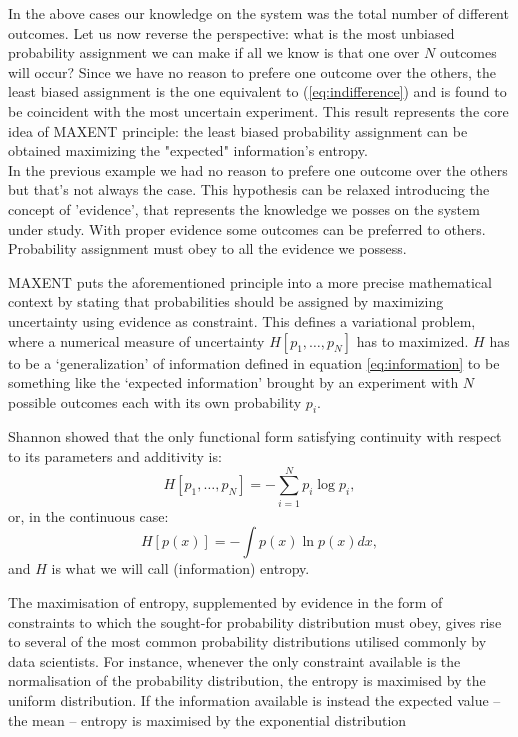 \documentclass[twocolumn,showpacs,preprintnumbers,nofootinbib,prd,
superscriptaddress,10pt]{revtex4-1}
\begin{document}
In the above cases our knowledge on the system was the total number of different outcomes. Let us now reverse the perspective: what is the most unbiased probability assignment we can make if all we know is that one over $N$ outcomes will occur? Since we have no reason to prefere one outcome over the others, the least biased assignment is the one equivalent to (\ref{eq:indifference}) and is found to be coincident with the most uncertain experiment. This result represents the core idea of MAXENT principle: the least biased probability assignment can be obtained maximizing the "expected" information's entropy. \\ 
In the previous example we had no reason to prefere one outcome over the others but that's not always the case. This hypothesis can be relaxed introducing the concept of 'evidence', that represents the knowledge we posses on the system under study. With proper evidence some outcomes can be preferred to others. Probability assignment must obey to all the evidence we possess. 
\par
MAXENT puts the aforementioned principle into a more precise mathematical context by stating that probabilities should be assigned by maximizing uncertainty using evidence as constraint. 
This defines a variational problem, where a numerical measure of uncertainty $H\left[p_1, \dots, p_N\right]$ has to maximized. $H$ has to be a `generalization' of information defined in equation \ref{eq:information} to be something like the `expected information' brought by an experiment with $N$ possible outcomes each with its own probability $p_i$.

Shannon \cite{Shannon} showed that the only functional form satisfying continuity with respect to its parameters and additivity is:
\begin{equation}\label{eq:entropy}
    H[p_1, \dots, p_N] = - \sum_{i = 1}^N p_i\log{p_i},
\end{equation}
or, in the continuous case:
\begin{equation}
    H[p(x)] = - \int p(x)\ln p(x) dx,
\end{equation}
and $H$ is what we will call (information) entropy.

The maximisation of entropy, supplemented by evidence in the form of constraints to which the sought-for probability distribution must obey,
gives rise to several of the most common probability distributions utilised commonly by data scientists. For instance, whenever the only constraint available is the normalisation of the probability distribution, the entropy is maximised by the uniform distribution. 
If the information available is instead the expected value -- the mean -- entropy is maximised by the  exponential distribution
\end{document}
